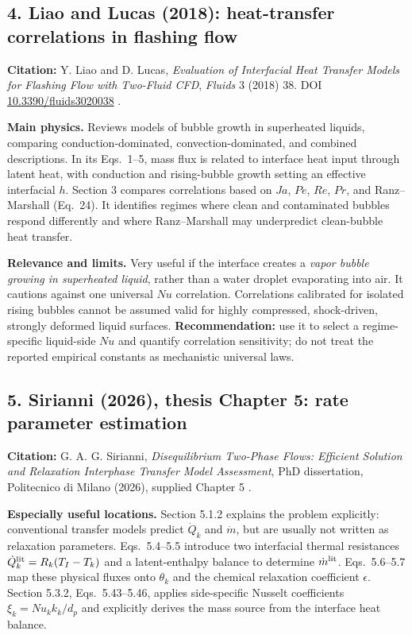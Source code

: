 \documentclass[11pt,letterpaper]{article}
\begin{document}
\subsection{4. Liao and Lucas (2018): heat-transfer correlations in flashing flow}
\textbf{Citation:} Y. Liao and D. Lucas, \emph{Evaluation of Interfacial Heat Transfer Models for Flashing Flow with Two-Fluid CFD}, \emph{Fluids} 3 (2018) 38. DOI \href{https://doi.org/10.3390/fluids3020038}{10.3390/fluids3020038} \cite{LiaoLucas2018}.

\textbf{Main physics.} Reviews models of bubble growth in superheated liquids, comparing conduction-dominated, convection-dominated, and combined descriptions. In its Eqs.~1--5, mass flux is related to interface heat input through latent heat, with conduction and rising-bubble growth setting an effective interfacial $h$. Section 3 compares correlations based on $Ja$, $Pe$, $Re$, $Pr$, and Ranz--Marshall (Eq.~24). It identifies regimes where clean and contaminated bubbles respond differently and where Ranz--Marshall may underpredict clean-bubble heat transfer.

\textbf{Relevance and limits.} Very useful if the interface creates a \emph{vapor bubble growing in superheated liquid}, rather than a water droplet evaporating into air. It cautions against one universal $Nu$ correlation. Correlations calibrated for isolated rising bubbles cannot be assumed valid for highly compressed, shock-driven, strongly deformed liquid surfaces. \textbf{Recommendation:} use it to select a regime-specific liquid-side $Nu$ and quantify correlation sensitivity; do not treat the reported empirical constants as mechanistic universal laws.

\subsection{5. Sirianni (2026), thesis Chapter 5: rate parameter estimation}
\textbf{Citation:} G. A. G. Sirianni, \emph{Disequilibrium Two-Phase Flows: Efficient Solution and Relaxation Interphase Transfer Model Assessment}, PhD dissertation, Politecnico di Milano (2026), supplied Chapter 5 \cite{SirianniThesis2026}.

\textbf{Especially useful locations.} Section 5.1.2 explains the problem explicitly: conventional transfer models predict $\dot Q_k$ and $\dot m$, but are usually not written as relaxation parameters. Eqs.~5.4--5.5 introduce two interfacial thermal resistances $\dot Q_k^{\rm lit}=R_k(T_I-T_k)$ and a latent-enthalpy balance to determine $\dot m^{\rm lit}$. Eqs.~5.6--5.7 map these physical fluxes onto $\theta_k$ and the chemical relaxation coefficient $\epsilon$. Section 5.3.2, Eqs.~5.43--5.46, applies side-specific Nusselt coefficients $\xi_k=Nu_k k_k/d_p$ and explicitly derives the mass source from the interface heat balance.
\end{document}
